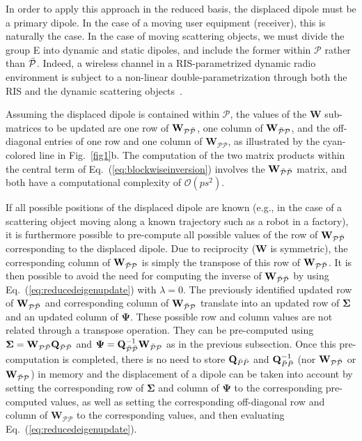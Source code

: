 \documentclass[journal,12pt,onecolumn,draftclsnofoot]{IEEEtran}
\begin{document}
In order to apply this approach in the reduced basis, the displaced dipole must be a primary dipole. In the case of a moving user equipment (receiver), this is naturally the case. In the case of moving scattering objects, we must divide the group E into dynamic and static dipoles, and include the former within $\mathcal{P}$ rather than $\mathcal{\Bar{P}}$. Indeed, a wireless channel in a RIS-parametrized dynamic radio environment is subject to a non-linear double-parametrization through both the RIS and the dynamic scattering objects~\cite{ChloeMag}.

Assuming the displaced dipole is contained within $\mathcal{P}$, the values of the $\mathbf{W}$ sub-matrices to be updated are one row of $\mathbf{W}_\mathcal{P\Bar{P}}$, one column of $\mathbf{W}_\mathcal{\Bar{P}P}$, and the off-diagonal entries of one row and one column of $\mathbf{W}_\mathcal{PP}$, as illustrated by the cyan-colored line in Fig.~\ref{fig1}b. The computation of the two matrix products within the central term of Eq.~(\ref{eq:blockwiseinversion}) involves the $\mathbf{W}_\mathcal{\Bar{P}\Bar{P}}$ matrix, and both have a computational complexity of $\mathcal{O}\left(ps^2\right)$.

If all possible positions of the displaced dipole are known (e.g., in the case of a scattering object moving along a known trajectory such as a robot in a factory), it is furthermore possible to pre-compute all possible values of the row of $\mathbf{W}_\mathcal{P\Bar{P}}$ corresponding to the displaced dipole. Due to reciprocity ($\mathbf{W}$ is symmetric), the corresponding column of $\mathbf{W}_\mathcal{\Bar{P}P}$ is simply the transpose of this row of $\mathbf{W}_\mathcal{P\Bar{P}}$. It is then possible to avoid the need for computing the inverse of $\mathbf{W}_\mathcal{\Bar{P}\Bar{P}}$ by using Eq.~(\ref{eq:reducedeigenupdate}) with $\lambda=0$. The previously identified updated row of $\mathbf{W}_\mathcal{P\Bar{P}}$ and corresponding column of $\mathbf{W}_\mathcal{\Bar{P}P}$ translate into an updated row of $\mathbf{\Sigma}$ and an updated column of $\mathbf{\Psi}$. 
These possible row and column values are not related through a transpose operation. They can be pre-computed using $\mathbf{\Sigma}=\mathbf{W}_{\mathcal{P\Bar{P}}} \mathbf{Q}_{\mathcal{\Bar{P}\Bar{P}}}$ and $\mathbf{\Psi}=\mathbf{Q}_{\mathcal{\Bar{P}\Bar{P}}}^{-1} \mathbf{W}_{\mathcal{\Bar{P}P}}$ as in the previous subsection. Once this pre-computation is completed, there is no need to store $\mathbf{Q}_{\Bar{P}\Bar{P}}$ and $\mathbf{Q}_{\Bar{P}\Bar{P}}^{-1}$ (nor $\mathbf{W}_\mathcal{P\Bar{P}}$ or $\mathbf{W}_\mathcal{\Bar{P}P}$) in memory and the displacement of a dipole can be taken into account by setting the corresponding row of $\mathbf{\Sigma}$ and column of $\mathbf{\Psi}$ to the corresponding pre-computed values, as well as setting the corresponding off-diagonal row and column of $\mathbf{W}_\mathcal{PP}$ to the corresponding values, and then evaluating Eq.~(\ref{eq:reducedeigenupdate}).
\end{document}
